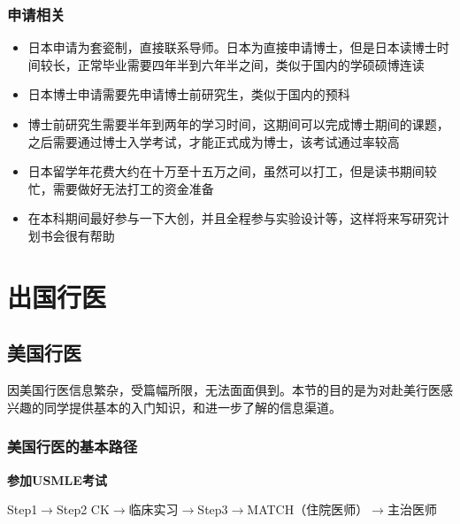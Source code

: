 \documentclass[zihao=-4,fontset=none]{Beautybook-CN}
\begin{document}
\subsubsection{申请相关}
\begin{itemize}
\item 日本申请为套瓷制，直接联系导师。日本为直接申请博士，但是日本读博士时间较长，正常毕业需要四年半到六年半之间，类似于国内的学硕硕博连读
\item 日本博士申请需要先申请博士前研究生，类似于国内的预科
\item 博士前研究生需要半年到两年的学习时间，这期间可以完成博士期间的课题，之后需要通过博士入学考试，才能正式成为博士，该考试通过率较高
\item 日本留学年花费大约在十万至十五万之间，虽然可以打工，但是读书期间较忙，需要做好无法打工的资金准备
\item 在本科期间最好参与一下大创，并且全程参与实验设计等，这样将来写研究计划书会很有帮助
\end{itemize}
\section{出国行医}
\subsection{美国行医}

因美国行医信息繁杂，受篇幅所限，无法面面俱到。本节的目的是为对赴美行医感兴趣的同学提供基本的入门知识，和进一步了解的信息渠道。

\subsubsection{美国行医的基本路径}

\textbf{参加USMLE考试}

Step1${\rightarrow}$Step2 CK${\rightarrow}$临床实习${\rightarrow}$Step3${\rightarrow}$MATCH（住院医师）${\rightarrow}$主治医师
\end{document}
